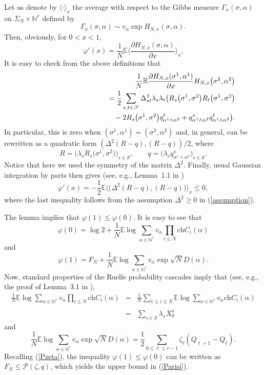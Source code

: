 \documentclass[aop,MSNbibl,dvips]{arximspdf}
\def\cal{\mathscr}
\newcommand{\spe}{{\cal S}}
\newcommand{\PP}{{\cal P}}
\newcommand{\ch}{\mathrm{ch}}
\newcommand{\smsp}{}
\newcommand{\e}{\mathbb{E}}
\newcommand{\Natural}{\mathbb{N}}
\newcommand{\la}{\langle}
\newcommand{\ra}{\rangle}
\begin{document}
\begin{pf} Let us denote by $\la \cdot\ra_x$ the average with
respect to the Gibbs measure $\Gamma_x(\sigma,\alpha)$ on $\Sigma
_N\times\Natural^r$ defined by
%
\[
\Gamma_x(\sigma,\alpha) \sim v_\alpha\exp
H_{N, x}(\sigma,\alpha).
\]
%
Then, obviously, for $0<x<1$,
%
\[
\varphi'(x) = \frac{1}{N}\e \biggl\la\frac{\partial H_{N, x}(\sigma
,\alpha)}{\partial x}
\biggr\ra_x.
\]
%
It is easy to check from the above definitions that
%
\begin{eqnarray*}
&& \frac{1}{N} \e\frac{\partial H_{N, x}(\sigma^1,\alpha^1)}{\partial
x} H_{N, x}\bigl(
\sigma^2,\alpha^2\bigr)
\\
&&\qquad = \frac{1}{2}\sum_{s,t\in\spe}
\Delta_{st}^2 \lambda_s \lambda_t
\bigl( R_s\bigl(\sigma^1,\sigma^2\bigr)
R_t\bigl(\sigma^1,\sigma^2\bigr)\\
&&\hspace*{106pt}{} -2
R_s\bigl(\sigma ^1,\sigma^2\bigr)
q^t_{\alpha^1\wedge\alpha^2} + q^s_{\alpha^1\wedge\alpha
^2}q^t_{\alpha
^1\wedge\alpha^2}
\bigr).
\end{eqnarray*}
%
In particular, this is zero when $(\sigma^1,\alpha^1)=(\sigma
^2,\alpha
^2)$ and, in general, can be rewritten as a quadratic form $(\Delta
^2(R-q),(R-q))/2$, where
%
\[
R= \bigl( \lambda_s R_s\bigl(\sigma^1,
\sigma^2\bigr) \bigr)_{s\in\spe},\qquad q= \bigl( \lambda_s
q^s_{\alpha^1\wedge\alpha^2} \bigr)_{s\in
\spe}.
\]
%
Notice that here we used the symmetry of the matrix $\Delta^2$.
Finally, usual Gaussian integration by parts then gives (see, e.g.,
Lemma~1.1 in \cite{SKmodel})
%
\[
\varphi'(x) = - \frac{1}{2}\e \bigl\la \bigl(
\Delta^2(R-q),(R-q) \bigr) \bigr\ra_x \leq0,
\]
%
where the last inequality follows from the assumption $\Delta^2\geq0$
in (\ref{assumption}).
\end{pf}



The lemma implies that $\varphi(1)\leq\varphi(0)$. It is easy to see that
%
\[
\varphi(0) = \log2 + \frac{1}{N}\smsp\e\log\sum
_{\alpha\in\Natural^r} v_{\alpha} \prod_{i\leq N}
\ch C_{i}(\alpha)
\]
%
and
%
\[
\varphi(1) = F_N + \frac{1}{N}\smsp\e\log\sum
_{\alpha\in\Natural^r} v_{\alpha} \exp\sqrt{N} D(\alpha).
\]
%
Now, standard properties of the Ruelle probability cascades imply that
(see, e.g., the proof of Lemma~3.1 in \cite{SKmodel}),
%
\begin{eqnarray}\label{simp1}
\frac{1}{N}\smsp\e\log\sum_{\alpha\in\Natural^r}
v_{\alpha} \prod_{i\leq N} \ch C_{i}(
\alpha) &=& \frac{1}{N}\smsp\sum_{1\leq i\leq N} \e\log\sum
_{\alpha\in
\Natural^r} v_{\alpha} \ch C_{i}(\alpha)
\nonumber
\\[-8pt]
\\[-8pt]
\nonumber
& =&
\sum_{s\in\spe} \lambda_s X^s_0
\end{eqnarray}
%
and
%
\begin{equation}
\frac{1}{N}\smsp\e\log\sum_{\alpha\in\Natural^r}
v_{\alpha} \exp\sqrt{N} D(\alpha) = \frac{1}{2} \sum
_{0\leq\ell\leq r-1} \zeta_\ell (Q_{\ell+1} -
Q_{\ell} ). \label{simp2}
\end{equation}
%
Recalling (\ref{Pzeta}), the inequality $\varphi(1)\leq\varphi(0)$ can
be written as $F_N\leq\PP(\zeta,q)$, which yields the upper bound in
(\ref{Parisi}).
\end{document}
